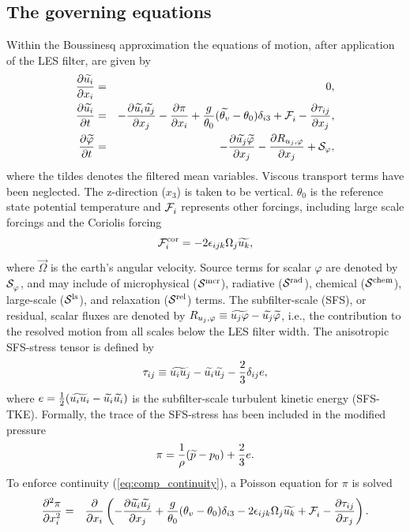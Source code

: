 \subsection{The governing equations}
Within the Boussinesq approximation the equations of motion, after application of the LES filter, are given by
\begin{eqnarray}
\label{eq:comp_continuity}
\frac{\partial \widetilde{u_i}}{\partial x_i} &=& 0,\\
\label{eq:comp_RANS}
\frac{\partial \widetilde{u_i}}{\partial t} &=& - \frac{\partial \widetilde{u_i}\widetilde{u_j}}{\partial x_j}-\frac{\partial \pi}{\partial x_i} + \frac{g}{\theta_0}(\widetilde{\theta_v}-\theta_0)\delta_{i3} + \mathcal{F}_{i}^{\mathrm{}}- \frac{\partial \tau_{ij}}{\partial x_j},\\
\label{eq:comp_varphi}
\frac{\partial \widetilde{\varphi}}{\partial t} &=& - \frac{\partial \widetilde{u_j}\widetilde{\varphi}}{\partial x_j}- \frac{\partial R_{u_j,\varphi}}{\partial x_j}+\mathcal{S}_{\varphi},
\end{eqnarray}
where the tildes denotes the filtered mean variables. Viscous transport terms have been neglected. The z-direction ($x_3$) is taken to be vertical. $\theta_0$ is the reference state potential temperature and  $\mathcal{F}_{i}^{\mathrm{}}$ represents other forcings, including large scale forcings and the Coriolis forcing
\begin{equation}
 \mathcal{F}_{i}^{\mathrm{cor}} = - 2\epsilon_{ijk}\Omega_j\widetilde{u_k},
\end{equation}
where $\vec{\Omega}$ is the earth's angular velocity. Source terms for scalar $\varphi$ are denoted by $\mathcal{S}_{\varphi}^{\mathrm{}}$, and may include of microphysical ($\mathcal{S}_{}^{\mathrm{mcr}}$), radiative ($\mathcal{S}_{}^{\mathrm{rad}}$), chemical ($\mathcal{S}_{}^{\mathrm{chem}}$), large-scale ($\mathcal{S}_{}^{\mathrm{ls}}$), and relaxation ($\mathcal{S}_{}^{\mathrm{rel}}$) terms.  The subfilter-scale (SFS), or residual, scalar fluxes are denoted by $R_{u_j,\varphi}\equiv\widetilde{u_j \varphi}-\widetilde{u_j}\widetilde{\varphi}$, i.e., the contribution to the resolved motion from all scales below the LES filter width. The anisotropic SFS-stress tensor is defined by
\begin{equation}
 \tau_{ij}\equiv \widetilde{u_iu_j}-\widetilde{u_i}\widetilde{u_j}-\frac{2}{3}\delta_{ij}e,
\end{equation}
where $e=\frac{1}{2}(\widetilde{u_iu_i}-\widetilde{u_i}\widetilde{u_i})$ is the subfilter-scale turbulent kinetic energy (SFS-TKE). Formally, the trace of the SFS-stress has been included in the modified pressure
\begin{equation}
\pi=\frac{1}{\rho}(\widetilde{p}-p_0)+\frac{2}{3}e.
\end{equation}
To enforce continuity (\eqnm  \ref{eq:comp_continuity}), a Poisson equation for $\pi$ is solved
\begin{eqnarray}
\derr{^2\pi}{x_i^2} &=& \derr{}{x_i}\left(- \derr{\fav{u_i}\fav{u_j}}{x_j}+ \frac{g}{\theta_0}({\theta_v}-\theta_0)\delta_{i3} \iftwocol{\right.\nonumber\\&&\left.}{}-2\epsilon_{ijk}\Omega_j\fav{u_k}+ \force{i}{}- \derr{\tau_{ij}}{x_j}\right).
\end{eqnarray}
